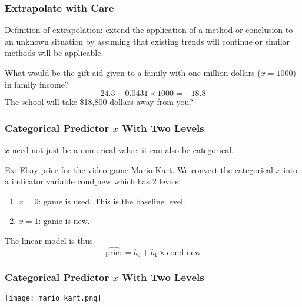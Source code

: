 \documentclass[slides]{beamer}
\newcommand{\blue}[1]{\textcolor{blue2}{#1}}
\begin{document}
\begin{frame}[fragile]
\frametitle{Extrapolate with Care}
Definition of \blue{extrapolation}:  extend the application of a method or conclusion to an unknown situation by assuming that existing trends will continue or similar methods will be applicable.

\vspace{0.5cm}
\pause
What would be the gift aid given to a family with one million dollars ($x=1000$) in family income?
\[
24.3 - 0.0431 \times 1000 = -18.8
\]
The school will take \$18,800 dollars away from you?  


\end{frame}


\begin{frame}[fragile]
\frametitle{Categorical Predictor $x$ With Two Levels}
$x$ need not just be a numerical value; it can also be categorical.  

\vspace{0.25cm}
\pause
Ex: Ebay price for the video game Mario Kart. We convert the categorical $x$ into a \blue{indicator variable} $\mbox{cond\_new}$ which has 2 \blue{levels}:
\begin{enumerate}
\item $x=0$:  game is used. This is the \blue{baseline} level.
\item $x=1$:  game is new.
\end{enumerate}
\pause
The linear model is thus
\[
\widehat{\mbox{price}} = b_0 + b_1 \times \mbox{cond\_new}
\]

\end{frame}


\begin{frame}[fragile]
\frametitle{Categorical Predictor $x$ With Two Levels}

\begin{center}
\texttt{[image: mario\_kart.png]}
\end{center}

\end{frame}
\end{document}
